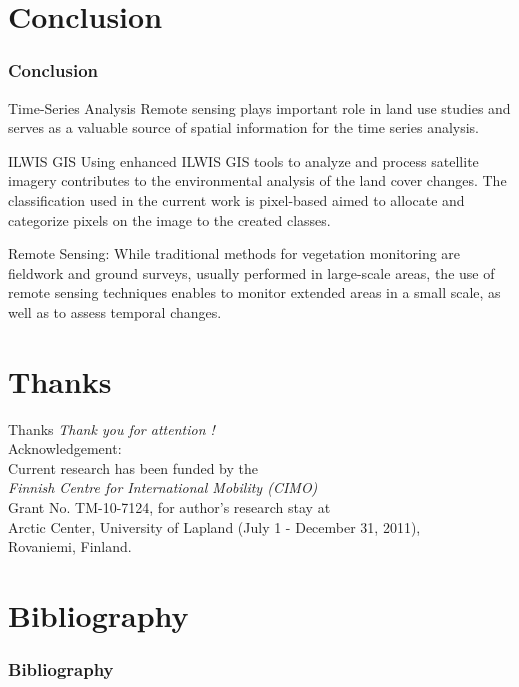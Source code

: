 \documentclass[pdflatex,compress,8pt,
	xcolor={dvipsnames,dvipsnames,svgnames,x11names,table},
	hyperref={colorlinks = true,
	breaklinks = true, 
	urlcolor = NavyBlue, 
	breaklinks = true}]{beamer}
\begin{document}
\section{Conclusion}
\begin{frame}\frametitle{Conclusion}

\begin{alertblock}{Time-Series Analysis}
Remote sensing plays important role in land use studies and serves as a valuable source of spatial information for the time series analysis.
\end{alertblock}

\begin{block}{ILWIS GIS}
Using enhanced ILWIS GIS tools to analyze and process satellite imagery contributes to the environmental analysis of the land cover changes. The classification used in the current work is pixel-based aimed to allocate and categorize pixels on the image to the created classes.
\end{block}

\begin{examples}{Remote Sensing:}
While traditional methods for vegetation monitoring are fieldwork and ground surveys, usually performed in large-scale areas, the use of remote sensing techniques enables to monitor extended areas in a small scale, as well as to assess temporal changes.
\end{examples}

\end{frame}

\section{Thanks}
\begin{frame}{Thanks}
  	\centering \LARGE 
  	\emph{Thank you for attention !}\\
	\vspace{5em}
\normalsize
Acknowledgement: \\
Current research has been funded by the \\
\emph{Finnish Centre for International Mobility (CIMO)} \\
Grant No. TM-10-7124, for author's research stay at \\
Arctic Center, University of Lapland (July 1 - December 31, 2011), \\
Rovaniemi, Finland.
\end{frame}


\section{Bibliography}
\begin{frame}[allowframebreaks]\frametitle{Bibliography}
	\nocite{*}
	\printbibliography[heading=none]
\end{frame}
\end{document}
